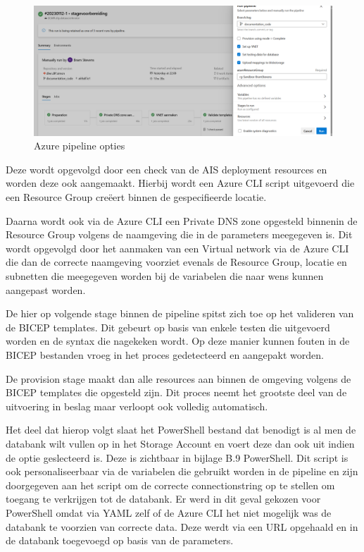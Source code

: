 \begin{figure}
    \centering
    \includegraphics[scale=0.40]{../img/Pipeline.png}
    \caption{\label{fig:Opties}Azure pipeline opties}
\end{figure}

Deze wordt opgevolgd door een check  van de AIS deployment resources en worden deze ook aangemaakt. Hierbij wordt een Azure CLI script uitgevoerd die een Resource Group creëert binnen de gespecifieerde locatie.

Daarna wordt ook via de Azure CLI een Private DNS zone opgesteld binnenin de Resource Group volgens de naamgeving die in de parameters meegegeven is. Dit wordt opgevolgd door het aanmaken van een Virtual network via de Azure CLI die dan de correcte naamgeving voorziet evenals de Resource Group, locatie en subnetten die meegegeven worden bij de variabelen die naar wens kunnen aangepast worden.

De hier op volgende stage binnen de pipeline spitst zich toe op het valideren van de BICEP templates. Dit gebeurt op basis van enkele testen die uitgevoerd worden en de syntax die nagekeken wordt. Op deze manier kunnen fouten in de BICEP bestanden vroeg in het proces gedetecteerd en aangepakt worden.

De provision stage maakt dan alle resources aan binnen de omgeving volgens de BICEP templates die opgesteld zijn. Dit proces neemt het grootste deel van de uitvoering in beslag maar verloopt ook volledig automatisch.

Het deel dat hierop volgt slaat het PowerShell bestand dat benodigt is al men de databank wilt vullen op in het Storage Account en voert deze dan ook uit indien de optie geslecteerd is. Deze is zichtbaar in bijlage B.9 PowerShell. Dit script is ook personaliseerbaar via de variabelen die gebruikt worden in de pipeline en zijn doorgegeven aan het script om de correcte connectionstring op te stellen om toegang te verkrijgen tot de databank. Er werd in dit geval gekozen voor PowerShell omdat via YAML zelf of de Azure CLI het niet mogelijk was de databank te voorzien van correcte data. Deze werdt via een URL opgehaald en in de databank toegevoegd op basis van de parameters.

